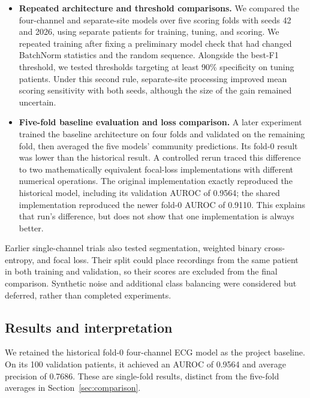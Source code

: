 \documentclass[11pt,a4paper]{article}
\newcommand{\draftnote}[1]{\par\smallskip\noindent\textcolor{blue}{\textbf{To write:} #1}\par\smallskip}
\begin{document}
\begin{itemize}
\item \textbf{Repeated architecture and threshold comparisons.}
We compared the four-channel and separate-site models over five scoring
folds with seeds 42 and 2026, using separate patients for training, tuning,
and scoring. We repeated training after fixing a preliminary model check
that had changed BatchNorm statistics and the random sequence. Alongside
the best-F1 threshold, we tested thresholds targeting at least 90\%
specificity on tuning patients. Under this second rule, separate-site
processing improved mean scoring sensitivity with both seeds, although
the size of the gain remained uncertain.

\item \textbf{Five-fold baseline evaluation and loss comparison.}
A later experiment trained the baseline architecture on four folds and
validated on the remaining fold, then averaged the five models' community
predictions. Its fold-0 result was lower than the historical result.
A controlled rerun traced this difference to two mathematically equivalent
focal-loss implementations with different numerical operations. The original
implementation exactly reproduced the historical model, including its
validation AUROC of 0.9564; the shared implementation reproduced the newer
fold-0 AUROC of 0.9110. This explains that run's difference, but does not
show that one implementation is always better.
\end{itemize}

Earlier single-channel trials also tested segmentation, weighted binary
cross-entropy, and focal loss. Their split could place recordings from the
same patient in both training and validation, so their scores are excluded
from the final comparison. Synthetic noise and additional class balancing
were considered but deferred, rather than completed experiments.


\subsection{Results and interpretation}
We retained the historical fold-0 four-channel ECG model as the project
baseline. On its 100 validation patients, it achieved an AUROC of 0.9564
and average precision of 0.7686. These are single-fold results, distinct
from the five-fold averages in Section~\ref{sec:comparison}.
\end{document}
